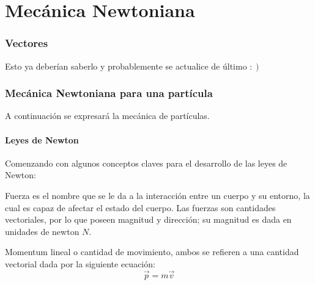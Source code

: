 \documentclass[/home/hernan/Documentos/Apuntes_mecanica_teorica/main.tex]{subfiles}
\begin{document}
	\part{Mecánica Newtoniana} 
	\label{prt:Mecánica Newtoniana}

	\section{Vectores}\label{sec:vectores}


	Esto ya deberían saberlo y probablemente se actualice de último $: \left . \!  \right)$

	\newpage
	\section{Mecánica Newtoniana para una partícula}\label{sec: N.particula }

	A continuación se expresará la mecánica de partículas.

	\subsection{Leyes de Newton}
	
	Comenzando con algunos conceptos claves para el desarrollo de las leyes de Newton:

	\begin{definition}
		Fuerza es el nombre que se le da a la interacción entre un cuerpo y su entorno, la cual es capaz de afectar el estado del cuerpo. Las fuerzas son cantidades vectoriales, por lo que poseen magnitud y dirección; su magnitud es dada en unidades de newton $N$.
	\end{definition}

	\begin{definition}
		Momentum lineal o cantidad de movimiento, ambos se refieren a una cantidad vectorial dada por la siguiente ecuación:
		\begin{equation}
			\vec{p} = m \vec{v}
			\label{eq: momentuml}
		\end{equation}
	\end{definition}

	
\end{document}
